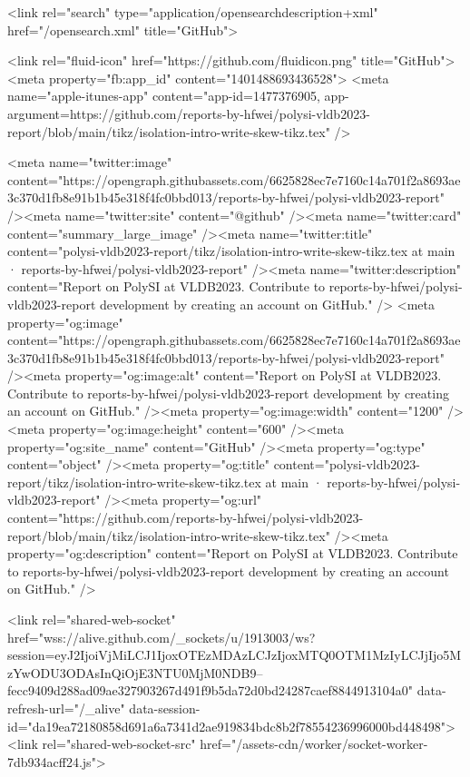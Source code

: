       <link rel="search" type="application/opensearchdescription+xml" href="/opensearch.xml" title="GitHub">

    <link rel="fluid-icon" href="https://github.com/fluidicon.png" title="GitHub">
    <meta property="fb:app_id" content="1401488693436528">
    <meta name="apple-itunes-app" content="app-id=1477376905, app-argument=https://github.com/reports-by-hfwei/polysi-vldb2023-report/blob/main/tikz/isolation-intro-write-skew-tikz.tex" />

      <meta name="twitter:image" content="https://opengraph.githubassets.com/6625828ec7e7160c14a701f2a8693ae3c370d1fb8e91b1b45e318f4fc0bbd013/reports-by-hfwei/polysi-vldb2023-report" /><meta name="twitter:site" content="@github" /><meta name="twitter:card" content="summary_large_image" /><meta name="twitter:title" content="polysi-vldb2023-report/tikz/isolation-intro-write-skew-tikz.tex at main · reports-by-hfwei/polysi-vldb2023-report" /><meta name="twitter:description" content="Report on PolySI at VLDB2023. Contribute to reports-by-hfwei/polysi-vldb2023-report development by creating an account on GitHub." />
  <meta property="og:image" content="https://opengraph.githubassets.com/6625828ec7e7160c14a701f2a8693ae3c370d1fb8e91b1b45e318f4fc0bbd013/reports-by-hfwei/polysi-vldb2023-report" /><meta property="og:image:alt" content="Report on PolySI at VLDB2023. Contribute to reports-by-hfwei/polysi-vldb2023-report development by creating an account on GitHub." /><meta property="og:image:width" content="1200" /><meta property="og:image:height" content="600" /><meta property="og:site_name" content="GitHub" /><meta property="og:type" content="object" /><meta property="og:title" content="polysi-vldb2023-report/tikz/isolation-intro-write-skew-tikz.tex at main · reports-by-hfwei/polysi-vldb2023-report" /><meta property="og:url" content="https://github.com/reports-by-hfwei/polysi-vldb2023-report/blob/main/tikz/isolation-intro-write-skew-tikz.tex" /><meta property="og:description" content="Report on PolySI at VLDB2023. Contribute to reports-by-hfwei/polysi-vldb2023-report development by creating an account on GitHub." />
  


      <link rel="shared-web-socket" href="wss://alive.github.com/_sockets/u/1913003/ws?session=eyJ2IjoiVjMiLCJ1IjoxOTEzMDAzLCJzIjoxMTQ0OTM1MzIyLCJjIjo5MzYwODU3ODAsInQiOjE3NTU0MjM0NDB9--fecc9409d288ad09ae327903267d491f9b5da72d0bd24287caef8844913104a0" data-refresh-url="/_alive" data-session-id="da19ea72180858d691a6a7341d2ae919834bdc8b2f78554236996000bd448498">
      <link rel="shared-web-socket-src" href="/assets-cdn/worker/socket-worker-7db934acff24.js">


